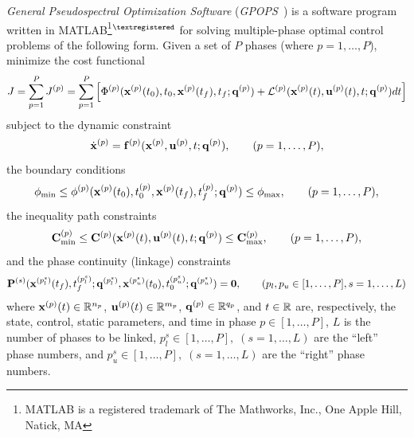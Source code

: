 \documentclass[10pt]{article}
\newcommand{\gpops}{{\em GPOPS}~}
\begin{document}
{\em General Pseudospectral Optimization Software}
(\gpops) is a software program written in MATLAB\footnote{MATLAB is a
  registered trademark of The Mathworks, Inc., One Apple Hill, Natick,
  MA}${}^{\textregistered}$ for solving multiple-phase optimal control
problems of the following form.  Given a set of $P$ phases (where
$p=1,\ldots,P$), minimize the cost functional
\begin{equation}
  J = \sum_{p=1}^{P} J^{(p)} = \sum_{p=1}^{P}
  \left[\Phi^{(p)}(\mathbf{x}^{(p)}(t_0),t_0,\mathbf{x}^{(p)}(t_f),t_f;\mathbf{q}^{(p)})
  + \mathcal{L}^{(p)}(\mathbf{x}^{(p)}(t),\mathbf{u}^{(p)}(t),t;\mathbf{q}^{(p)})dt \right]
\end{equation}
subject to the dynamic constraint
\begin{equation}
  \dot{\mathbf{x}}^{(p)} = \mathbf{f}^{(p)}(\mathbf{x}^{(p)},\mathbf{u}^{(p)},t;\mathbf{q}^{(p)}), \qquad (p=1,\ldots,P),
\end{equation}
the boundary conditions
\begin{equation}
  \mathbf{\phi}_{\min} \leq
  \mathbf{\phi}^{(p)}(\mathbf{x}^{(p)}(t_0),t_0^{(p)},\mathbf{x}^{(p)}(t_f),t_f^{(p)};\mathbf{q}^{(p)})
  \leq \mathbf{\phi}_{\max}, \qquad (p=1,\ldots,P),
\end{equation}
the inequality path constraints
\begin{equation}
  \mathbf{C}_{\min}^{(p)} \leq \mathbf{C}^{(p)}(\mathbf{x}^{(p)}(t),\mathbf{u}^{(p)}(t),t;\mathbf{q}^{(p)})\leq  \mathbf{C}_{\max}^{(p)}, \qquad
  (p=1,\ldots,P),
\end{equation}
and the phase continuity (linkage) constraints
\begin{equation}
  \mathbf{P}^{(s)}(\mathbf{x}^{(p_l^s)}(t_f),t_f^{(p_l^s)};\mathbf{q}^{(p_l^s)},\mathbf{x}^{(p_u^s)}(t_0),t_0^{(p_u^s)};\mathbf{q}^{(p_u^s)})
  =   \mathbf{0}, \qquad (p_l,p_u\in[1,\ldots,P],s=1,\ldots,L)
\end{equation}
where $\mathbf{x}^{(p)}(t)\in\mathbb{R}^{n_p}$, $\mathbf{u}^{(p)}(t)\in\mathbb{R}^{m_p}$,
$\mathbf{q}^{(p)}\in\mathbb{R}^{q_p}$, and $t\in\mathbb{R}$ are, respectively, the state,
control, static parameters, and time in phase $p\in[1,\ldots,P]$, $L$
is the number of phases to be linked,
$p_l^s\in[1,\ldots,P],\;(s=1,\ldots,L)$ are the ``left'' phase numbers,
and $p_u^s\in[1,\ldots,P],\;(s=1,\ldots,L)$ are the ``right'' phase
numbers.
\end{document}
